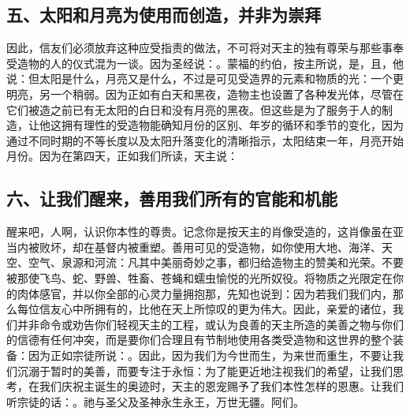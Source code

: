 \subsection{五、太阳和月亮为使用而创造，并非为崇拜}

因此，信友们必须放弃这种应受指责的做法，不可将对天主的独有尊荣与那些事奉受造物的人的仪式混为一谈。因为圣经说：。蒙福的约伯，按主所说，是，且，他说：但太阳是什么，月亮又是什么，不过是可见受造界的元素和物质的光：一个更明亮，另一个稍弱。因为正如有白天和黑夜，造物主也设置了各种发光体，尽管在它们被造之前已有无太阳的白日和没有月亮的黑夜。但这些是为了服务于人的制造，让他这拥有理性的受造物能确知月份的区别、年岁的循环和季节的变化，因为通过不同时期的不等长度以及太阳升落变化的清晰指示，太阳结束一年，月亮开始月份。因为在第四天，正如我们所读，天主说：\par


\subsection{六、让我们醒来，善用我们所有的官能和机能}

醒来吧，人啊，认识你本性的尊贵。记念你是按天主的肖像受造的，这肖像虽在亚当内被败坏，却在基督内被重塑。善用可见的受造物，如你使用大地、海洋、天空、空气、泉源和河流：凡其中美丽奇妙之事，都归给造物主的赞美和光荣。不要被那使飞鸟、蛇、野兽、牲畜、苍蝇和蠕虫愉悦的光所奴役。将物质之光限定在你的肉体感官，并以你全部的心灵力量拥抱那，先知也说到：因为若我们我们内，那么每位信友心中所拥有的，比他在天上所惊叹的更为伟大。因此，亲爱的诸位，我们并非命令或劝告你们轻视天主的工程，或认为良善的天主所造的美善之物与你们的信德有任何冲突，而是要你们合理且有节制地使用各类受造物和这世界的整个装备：因为正如宗徒所说：。因此，因为我们为今世而生，为来世而重生，不要让我们沉溺于暂时的美善，而要专注于永恒：为了能更近地注视我们的希望，让我们思考，在我们庆祝主诞生的奥迹时，天主的恩宠赐予了我们本性怎样的恩惠。让我们听宗徒的话：。祂与圣父及圣神永生永王，万世无疆。阿们。\par

